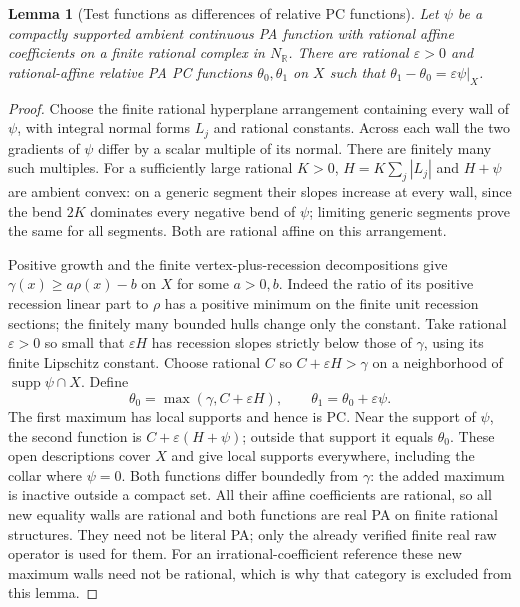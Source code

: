 \documentclass[11pt]{article}
\newtheorem{lemma}[theorem]{Lemma}
\newcommand{\R}{\mathbb R}
\begin{document}
\begin{lemma}[Test functions as differences of relative PC functions]\label{test-dc}
Let $\psi$ be a compactly supported ambient continuous PA function with
rational affine coefficients on a finite rational complex in $N_\R$.
There are rational $\varepsilon>0$ and rational-affine relative PA PC
functions $\theta_0,\theta_1$ on $X$ such that
$\theta_1-\theta_0=\varepsilon\psi|_X$.
\end{lemma}
\begin{proof}
Choose the finite rational hyperplane arrangement containing every wall
of $\psi$, with integral normal forms $L_j$ and rational constants.
Across each wall the two gradients of $\psi$ differ by a scalar multiple
of its normal. There are finitely many such multiples. For a sufficiently
large rational $K>0$, $H=K\sum_j|L_j|$ and $H+\psi$ are ambient convex:
on a generic segment their slopes increase at every wall, since the
bend $2K$ dominates every negative bend of $\psi$; limiting generic
segments prove the same for all segments. Both are rational affine on
this arrangement.

Positive growth and the finite vertex-plus-recession decompositions give
$\gamma(x)\geq a\rho(x)-b$ on $X$ for some $a>0,b$.
Indeed the ratio of its positive recession linear part to $\rho$ has
a positive minimum on the finite unit recession sections; the finitely
many bounded hulls change only the constant. Take rational
$\varepsilon>0$ so small that $\varepsilon H$ has recession slopes
strictly below those of $\gamma$, using its finite Lipschitz constant.
Choose rational $C$ so $C+\varepsilon H>\gamma$ on a neighborhood of
$\operatorname{supp}\psi\cap X$. Define
\[
 \theta_0=\max(\gamma,C+\varepsilon H),\qquad
 \theta_1=\theta_0+\varepsilon\psi.
\]
The first maximum has local supports and hence is PC. Near the support
of $\psi$, the second function is $C+\varepsilon(H+\psi)$; outside
that support it equals $\theta_0$. These open descriptions cover $X$
and give local supports everywhere, including the collar where
$\psi=0$. Both functions differ boundedly from $\gamma$: the added
maximum is inactive outside a compact set. All their affine coefficients
are rational, so all new equality walls are rational and both functions
are real PA on finite rational structures. They need not be literal PA;
only the already verified finite real raw operator is used for them.
For an irrational-coefficient reference these new maximum walls need
not be rational, which is why that category is excluded from this lemma.
\end{proof}
\end{document}
